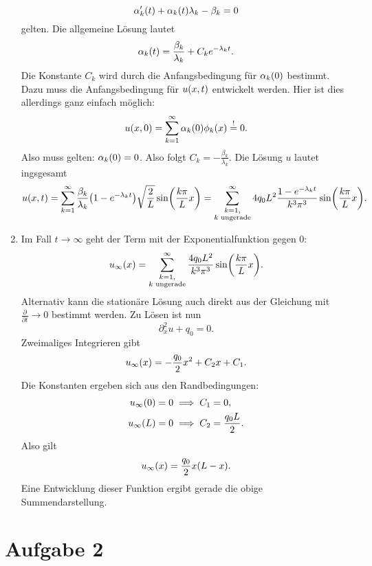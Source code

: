 \documentclass{exercise}
\begin{document}
\begin{enumerate}
        \[
            \alpha_k'\parentheses*{t} + \alpha_k\parentheses*{t}\lambda_k - \beta_k = 0
        \]
        gelten.
        Die allgemeine Lösung lautet
        \[
            \alpha_k\parentheses*{t} = \frac{\beta_k}{\lambda_k} + C_k e^{-\lambda_k t}.
        \]
        Die Konstante \(C_k\) wird durch die Anfangsbedingung für \(\alpha_k\parentheses*{0}\) bestimmt.
        Dazu muss die Anfangsbedingung für \(u\parentheses*{x, t}\) entwickelt werden.
        Hier ist dies allerdings ganz einfach möglich:
        \[
            u\parentheses*{x, 0} = \sum_{k = 1}^\infty \alpha_k\parentheses*{0}\phi_k\parentheses*{x} \stackrel{!}{=} 0.
        \]
        Also muss gelten: \(\alpha_k\parentheses*{0} = 0\).
        Also folgt \(C_k = -\frac{\beta_k}{\lambda_k}\).
        Die Lösung \(u\) lautet ingsgesamt
        \[
            u\parentheses*{x, t} = \sum_{k = 1}^\infty \frac{\beta_k}{\lambda_k}\parentheses*{1 - e^{-\lambda_k t}}\sqrt{\frac{2}{L}}\sin\parentheses*{\frac{k\pi}{L}x} = \sum_{\substack{k = 1,\\k\text{ ungerade}}}^\infty 4q_0 L^2 \frac{1 - e^{-\lambda_k t}}{k^3 \pi^3}\sin\parentheses*{\frac{k\pi}{L}x}.
        \]
        \item Im Fall \(t \to \infty\) geht der Term mit der Exponentialfunktion gegen \(0\):
        \[
            u_\infty\parentheses*{x} = \sum_{\substack{k = 1,\\k\text{ ungerade}}}^\infty \frac{4q_0 L^2}{k^3 \pi^3}\sin\parentheses*{\frac{k\pi}{L}x}.
        \]
        Alternativ kann die stationäre Lösung auch direkt aus der Gleichung mit \(\frac{\partial}{\partial t} \to 0\) bestimmt werden.
        Zu Lösen ist nun
        \[
            \partial_x^2 u + q_0 = 0.
        \]
        Zweimaliges Integrieren gibt
        \[
            u_\infty\parentheses*{x} = -\frac{q_0}{2}x^2 + C_2 x + C_1.
        \]
        Die Konstanten ergeben sich aus den Randbedingungen:
        \begin{align*}
            u_\infty\parentheses*{0} = 0 &\implies C_1 = 0,\\
            u_\infty\parentheses*{L} = 0 &\implies C_2 = \frac{q_0 L}{2}.
        \end{align*}
        Also gilt
        \[
            u_\infty\parentheses*{x} = \frac{q_0}{2}x\parentheses*{L - x}.
        \]
        Eine Entwicklung dieser Funktion ergibt gerade die obige Summendarstellung.
    \end{enumerate}


    \section*{Aufgabe 2}
    
\end{document}
